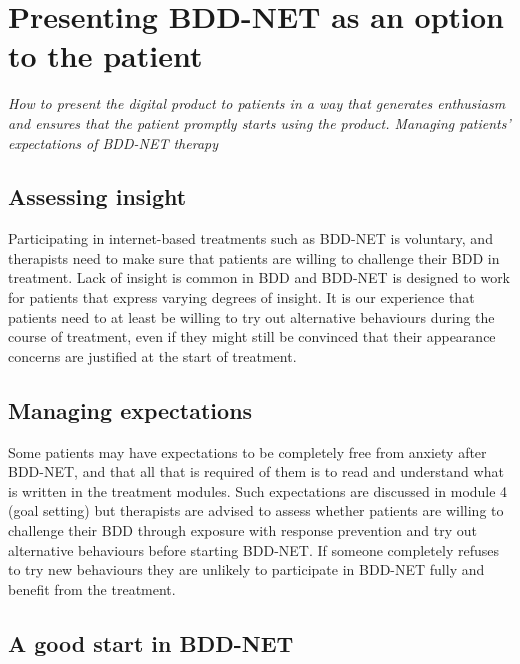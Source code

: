 \documentclass[]{book}
\theoremstyle{definition}
\theoremstyle{definition}
\theoremstyle{definition}
\theoremstyle{remark}
\begin{document}
\hypertarget{presenting-bdd-net-as-an-option-to-the-patient}{%
\section{Presenting BDD-NET as an option to the
patient}\label{presenting-bdd-net-as-an-option-to-the-patient}}

\emph{How to present the digital product to patients in a way that
generates enthusiasm and ensures that the patient promptly starts using
the product. Managing patients' expectations of BDD-NET therapy}

\hypertarget{assessing-insight}{%
\subsection{Assessing insight}\label{assessing-insight}}

Participating in internet-based treatments such as BDD-NET is voluntary,
and therapists need to make sure that patients are willing to challenge
their BDD in treatment. Lack of insight is common in BDD and BDD-NET is
designed to work for patients that express varying degrees of insight.
It is our experience that patients need to at least be willing to try
out alternative behaviours during the course of treatment, even if they
might still be convinced that their appearance concerns are justified at
the start of treatment.

\hypertarget{managing-expectations}{%
\subsection{Managing expectations}\label{managing-expectations}}

Some patients may have expectations to be completely free from anxiety
after BDD-NET, and that all that is required of them is to read and
understand what is written in the treatment modules. Such expectations
are discussed in module 4 (goal setting) but therapists are advised to
assess whether patients are willing to challenge their BDD through
exposure with response prevention and try out alternative behaviours
before starting BDD-NET. If someone completely refuses to try new
behaviours they are unlikely to participate in BDD-NET fully and benefit
from the treatment.

\hypertarget{a-good-start-in-bdd-net}{%
\subsection{A good start in BDD-NET}\label{a-good-start-in-bdd-net}}
\end{document}
